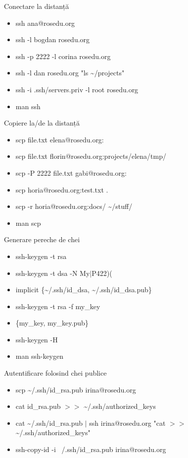 \documentclass{beamer}
\begin{document}
\begin{frame}{Conectare la distanță}
  \begin{itemize}
    \item ssh ana@rosedu.org
    \item ssh -l bogdan rosedu.org
    \item ssh -p 2222 -l corina rosedu.org
    \item ssh -l dan rosedu.org "ls \~{}/projects"
    \item ssh -i .ssh/servers.priv -l root rosedu.org
    \item man ssh
  \end{itemize}
\end{frame}

\begin{frame}{Copiere la/de la distanță}
  \begin{itemize}
    \item scp file.txt elena@rosedu.org:
    \item scp file.txt florin@rosedu.org:projects/elena/tmp/
    \item scp -P 2222 file.txt gabi@rosedu.org:
    \item scp horia@rosedu.org:test.txt .
    \item scp -r horia@rosedu.org:docs/ \~{}/stuff/
    \item man scp
  \end{itemize}
\end{frame}

\begin{frame}{Generare pereche de chei}
  \begin{itemize}
    \item ssh-keygen -t rsa
    \item ssh-keygen -t dsa -N My$|$P422)(
    \item implicit \{\~{}/.ssh/id\_dsa, \~{}/.ssh/id\_dsa.pub\}
    \item ssh-keygen -t rsa -f my\_key
    \item \{my\_key, my\_key.pub\}
	\item ssh-keygen -H
    \item man ssh-keygen
  \end{itemize}
\end{frame}

\begin{frame}{Autentificare folosind chei publice}
  \begin{itemize}
        \item scp \~{}/.ssh/id\_rsa.pub irina@rosedu.org
        \item cat id\_rsa.pub $>>$ \~{}/.ssh/authorized\_keys
	\end{itemize}
	\pause \begin{itemize}
    	\item cat \~{}/.ssh/id\_rsa.pub $|$ ssh irina@rosedu.org "cat
$>>$ \~{}/.ssh/authorized\_keys"
	\end{itemize}
	\pause \begin{itemize}
		\item ssh-copy-id -i ~/.ssh/id\_rsa.pub irina@rosedu.org
  \end{itemize}
\end{frame}
\end{document}

